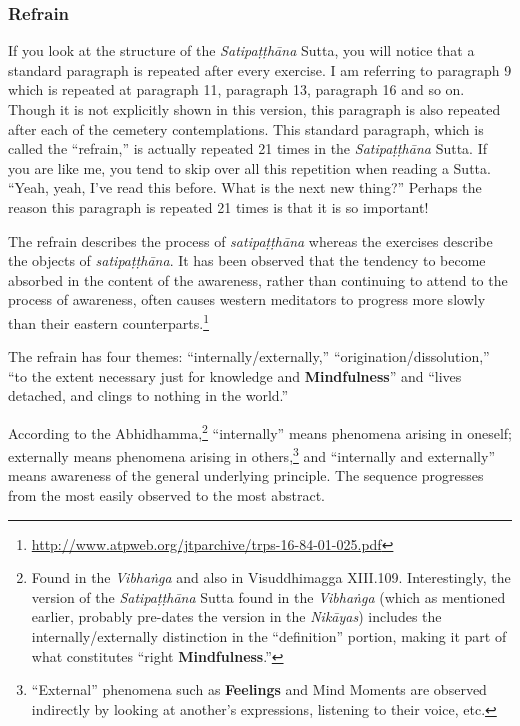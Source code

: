 \subsubsection*{Refrain}

If you look at the structure of the \textit{Satipaṭṭhāna} Sutta, you will notice that a standard paragraph is repeated after every exercise. I am referring to paragraph 9 which is repeated at paragraph 11, paragraph 13, paragraph 16 and so on. Though it is not explicitly shown in this version, this paragraph is also repeated after each of the cemetery contemplations. This standard paragraph, which is called the “refrain,” is actually repeated 21 times in the \textit{Satipaṭṭhāna} Sutta. If you are like me, you tend to skip over all this repetition when reading a Sutta. “Yeah, yeah, I’ve read this before. What is the next new thing?” Perhaps the reason this paragraph is repeated 21 times is that it is so important!

The refrain describes the process of \textit{satipaṭṭhāna} whereas the exercises describe the objects of \textit{satipaṭṭhāna}. It has been observed that the tendency to become absorbed in the content of the awareness, rather than continuing to attend to the process of awareness, often causes western meditators to progress more slowly than their eastern counterparts.\footnote{\url{http://www.atpweb.org/jtparchive/trps-16-84-01-025.pdf}}

The refrain has four themes: “internally/externally,” “origination/dissolution,” “to the extent necessary just for knowledge and \textbf{Mindfulness}” and “lives detached, and clings to nothing in the world.”

According to the Abhidhamma,\footnote{Found in the \textit{Vibhaṅga} and also in Visuddhimagga XIII.109. Interestingly, the version of the \textit{Satipaṭṭhāna} Sutta found in the \textit{Vibhaṅga} (which as mentioned earlier, probably pre-dates the version in the \textit{Nikāyas}) includes the internally/externally distinction in the “definition” portion, making it part of what constitutes “right \textbf{Mindfulness}.”} “internally” means phenomena arising in oneself; externally means phenomena arising in others,\footnote{“External” phenomena such as \textbf{Feelings} and Mind Moments are observed indirectly by looking at another’s expressions, listening to their voice, etc.} and “internally and externally” means awareness of the general underlying principle. The sequence progresses from the most easily observed to the most abstract.


